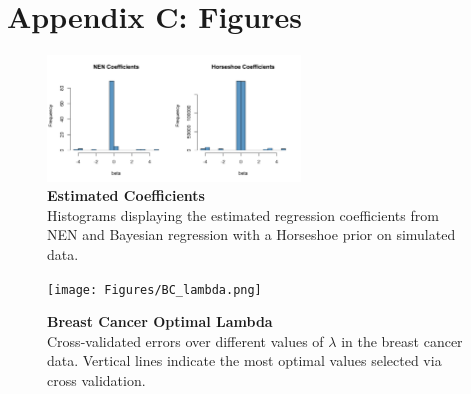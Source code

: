 \documentclass[
	a4paper, %
	10pt, %
	unnumberedsections, %
	twoside, %
]{LTJournalArticle}
\newcommand{\1}{\mathbbm{1}}
\begin{document}
\pagebreak 

\section{Appendix C: Figures}

\begin{figure}[ht] %
\centering
\captionsetup{justification=centering, margin=-0.2cm}
\includegraphics[width=0.6\textwidth]{Figures/simulate_betahat.png} 
\caption{\textbf{Estimated Coefficients} \\
Histograms displaying the estimated regression coefficients from NEN and Bayesian regression with a Horseshoe prior on simulated data.}
\label{fig:EN-lambda}
\end{figure} 



\begin{figure}[ht] %
\centering
\captionsetup{justification=centering, margin=-0.2cm}
\texttt{[image: Figures/BC\_lambda.png]} 
\caption{\textbf{Breast Cancer Optimal Lambda} \\
Cross-validated errors over different values of $\lambda$ in the breast cancer data. Vertical lines indicate the most optimal values selected via cross validation.}
\label{fig:BC-lambda}
\end{figure} 
\end{document}
